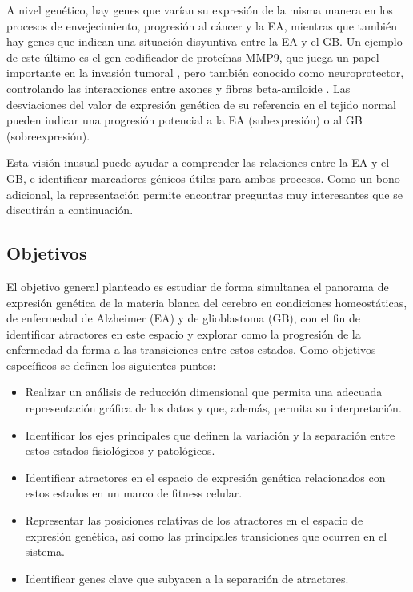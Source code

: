 A nivel genético, hay genes que varían su expresión de la misma manera en los procesos de envejecimiento, progresión al cáncer y la EA, mientras que también hay genes que indican una situación disyuntiva entre la EA y el GB. Un ejemplo de este último es el gen codificador de proteínas MMP9, que juega un papel importante en la invasión tumoral \cite{Choe2002, Xue_2017}, pero también conocido como neuroprotector, controlando las interacciones entre axones y fibras beta-amiloide \cite{Kaminari_2017}. Las desviaciones del valor de expresión genética de su referencia en el tejido normal pueden indicar una progresión potencial a la EA (subexpresión) o al GB (sobreexpresión).

Esta visión inusual puede ayudar a comprender las relaciones entre la EA y el GB, e identificar marcadores génicos útiles para ambos procesos. Como un bono adicional, la representación permite encontrar preguntas muy interesantes que se discutirán a continuación.

\subsection*{Objetivos}
El objetivo general planteado es estudiar de forma simultanea el panorama de expresión genética de la materia blanca del cerebro en condiciones homeostáticas, de enfermedad de Alzheimer (EA) y de glioblastoma (GB), con el fin de identificar atractores en este espacio y explorar como la progresión de la enfermedad da forma a las transiciones entre estos estados. Como objetivos específicos se definen los siguientes puntos:

\begin{itemize}
	\item Realizar un análisis de reducción dimensional que permita una adecuada representación gráfica de los datos y que, además, permita su interpretación.
	
	\item Identificar los ejes principales que definen la variación y la separación entre estos estados fisiológicos y patológicos.
	
	\item Identificar atractores en el espacio de expresión genética relacionados con estos estados en un marco de fitness celular.
	
	\item Representar las posiciones relativas de los atractores en el espacio de expresión genética, así como las principales transiciones que ocurren en el sistema.
	
	\item Identificar genes clave que subyacen a la separación de atractores.
\end{itemize}




